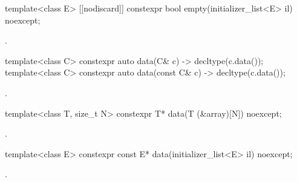 \begin{indexed}{}
\begin{itemdecl}
template<class E> [[nodiscard]] constexpr bool empty(initializer_list<E> il) noexcept;
\end{itemdecl}
\end{indexed}
\begin{itemdescr}
\pnum
\returns
{}.
\end{itemdescr}

%
\begin{itemdecl}
template<class C> constexpr auto data(C& c) -> decltype(c.data());
template<class C> constexpr auto data(const C& c) -> decltype(c.data());
\end{itemdecl}
\begin{itemdescr}
\pnum
\returns
{}.
\end{itemdescr}

%
\begin{itemdecl}
template<class T, size_t N> constexpr T* data(T (&array)[N]) noexcept;
\end{itemdecl}
\begin{itemdescr}
\pnum
\returns
{}.
\end{itemdescr}

%
\begin{itemdecl}
template<class E> constexpr const E* data(initializer_list<E> il) noexcept;
\end{itemdecl}
\begin{itemdescr}
\pnum
\returns
{}.
\end{itemdescr}

